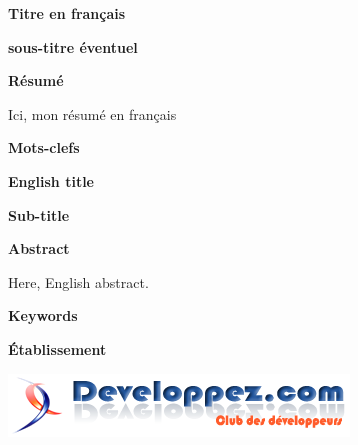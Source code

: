 \clearpage
\ifodd\thepage\hbox{}\newpage\else\fi%
\thispagestyle{empty}\parindent=0pt
{\Large \textbf{Titre en français}}

{\large \textbf{sous-titre éventuel}}

\hrulefill%
\begin{center}
{\Large \textbf{Résumé}}
\end{center}
Ici, mon résumé en français

\hrulefill%

{\Large \textbf{Mots-clefs}}

\hrulefill%

{\Large \textbf{English title}}

{\large \textbf{Sub-title}}

\hrulefill%
\begin{center}
{\Large \textbf{Abstract}}
\end{center}
Here, English abstract.

\hrulefill%

{\Large \textbf{Keywords}}

\hrulefill%


\hrulefill

{\Large \textbf{\'Etablissement} }

\hfill\includegraphics[scale=0.5]{../images/clubdesdevp.png} 

\hrulefill



